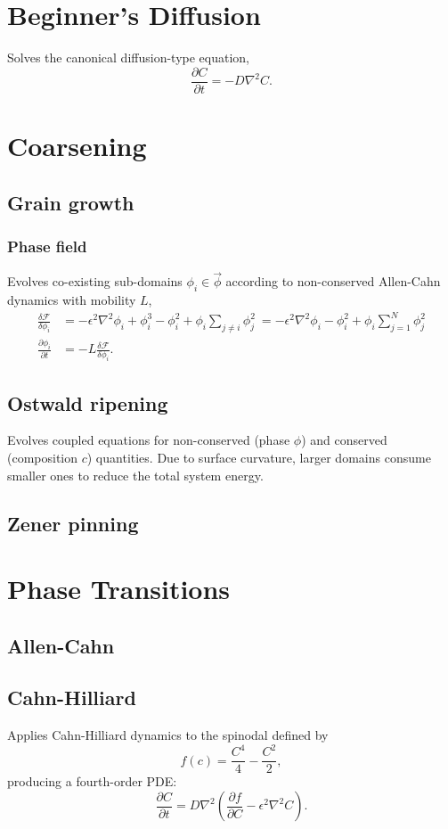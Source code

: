 \section{Beginner's Diffusion}
	Solves the canonical diffusion-type equation,
	\[\frac{\partial C}{\partial t} = -D\nabla^2C.\]

\section{Coarsening}
	\subsection{Grain growth}
		\subsubsection{Phase field}
			Evolves co-existing sub-domains $\phi_i\in\vec{\phi}$ according to non-conserved
			Allen-Cahn dynamics with mobility $L$,
			\begin{align*}
				\frac{\delta\mathcal{F}}{\delta\phi_i} &= -\epsilon^2\nabla^2\phi_i + \phi_i^3 - \phi_i^2 + \phi_i\sum\limits_{j\neq i}\phi_j^2 \
			    	                                    = -\epsilon^2\nabla^2\phi_i - \phi_i^2 + \phi_i\sum\limits_{j=1}^N\phi_j^2\\
				\frac{\partial\phi_i}{\partial t} &= -L\frac{\delta\mathcal{F}}{\delta\phi_i}.
			\end{align*}
		
	\subsection{Ostwald ripening}
		Evolves coupled equations for non-conserved (phase $\phi$) and conserved
		(composition $c$) quantities.
		Due to surface curvature, larger domains consume smaller ones to reduce the
		total system energy.

	\subsection{Zener pinning}

\section{Phase Transitions}
	\subsection{Allen-Cahn}
	\subsection{Cahn-Hilliard}
		Applies Cahn-Hilliard dynamics to the spinodal defined by 
		\[f(c) = \frac{C^4}{4} - \frac{C^2}{2},\]
		producing a fourth-order PDE:
		\[\frac{\partial C}{\partial t} = D\nabla^2\left(\frac{\partial f}{\partial C} - \epsilon^2\nabla^2 C\right).\]

